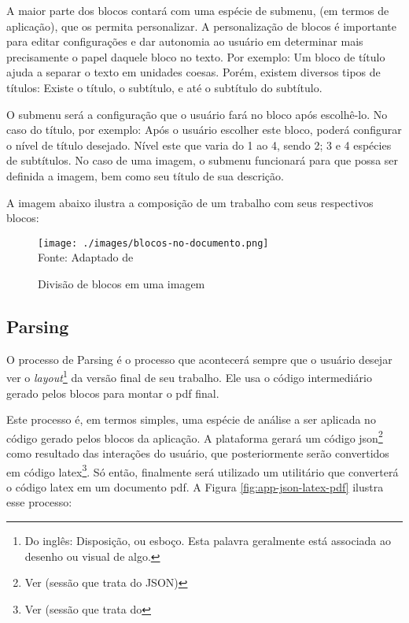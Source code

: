 A maior parte dos blocos contará com uma espécie de submenu, (em termos de aplicação),
que os permita personalizar. A personalização de blocos é importante para editar
configurações e dar autonomia ao usuário em determinar mais precisamente o papel
daquele bloco no texto. Por exemplo: Um bloco de título ajuda a separar o texto
em unidades coesas. Porém, existem diversos tipos de títulos: Existe o título, o
subtítulo, e até o subtítulo do subtítulo.

O submenu será a configuração que o usuário fará no bloco após escolhê-lo. No
caso do título, por exemplo: Após o usuário escolher este bloco, poderá configurar
o nível de título desejado. Nível este que varia do 1 ao 4, sendo 2; 3 e 4
espécies de subtítulos. No caso de uma imagem, o submenu funcionará para que possa
ser definida a imagem, bem como seu título de sua descrição.

A imagem abaixo ilustra a composição de um trabalho com seus respectivos blocos:

\begin{figure}[H]
    \centering
    \caption{Divisão de blocos em uma imagem}
    \texttt{[image: ./images/blocos-no-documento.png]}
    \label{fig:blocos-no-documento} \\
    \textnormal{\fontsize{10pt}{12pt}Fonte: Adaptado de \cite{pucgo}}
\end{figure}

\subsection{Parsing}

O processo de Parsing é o processo que acontecerá sempre que o usuário desejar
ver o
\textit{layout}\footnote{Do inglês: Disposição, ou esboço. Esta palavra geralmente está associada ao desenho ou visual de algo.
}
da versão final de seu trabalho. Ele usa o código intermediário gerado pelos blocos para montar o
\acrshort{pdf}
final.

Este processo é, em termos simples, uma espécie de análise a ser aplicada no código gerado pelos blocos
da aplicação. A plataforma gerará um código
\acrshort{json}\footnote{Ver (sessão que trata do JSON)
}
como resultado das interações do usuário, que posteriormente
serão convertidos em código
\acrshort{latex}\footnote{Ver (sessão que trata do }.
Só então, finalmente será utilizado um utilitário que converterá o código \acrshort{latex}
em um documento
\acrshort{pdf}. A
Figura \ref{fig:app-json-latex-pdf} ilustra esse processo:

